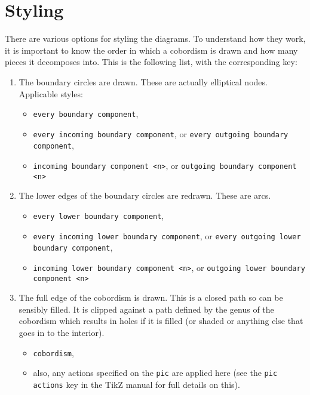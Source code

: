 \documentclass{ltxdoc}
\begin{document}
\section{Styling}

There are various options for styling the diagrams.
To understand how they work, it is important to know the order in which a cobordism is drawn and how many pieces it decomposes into.
This is the following list, with the corresponding key:

\begin{enumerate}
\item The boundary circles are drawn.
These are actually elliptical nodes.
Applicable styles:

\begin{itemize}
\item \Verb+every boundary component+,
\item \Verb+every incoming boundary component+, or  \Verb+every outgoing boundary component+,
\item \Verb+incoming boundary component <n>+, or \Verb+outgoing boundary component <n>+
\end{itemize}

\item The lower edges of the boundary circles are redrawn.
These are arcs.

\begin{itemize}
\item \Verb+every lower boundary component+,
\item \Verb+every incoming lower boundary component+, or  \Verb+every outgoing lower boundary component+,
\item \Verb+incoming lower boundary component <n>+, or \Verb+outgoing lower boundary component <n>+
\end{itemize}

\item The full edge of the cobordism is drawn.
This is a closed path so can be sensibly filled.
It is clipped against a path defined by the genus of the cobordism which results in holes if it is filled (or shaded or anything else that goes in to the interior).

\begin{itemize}
\item \Verb+cobordism+,
\item also, any actions specified on the \Verb+pic+ are applied here (see the \Verb+pic actions+ key in the TikZ manual for full details on this).
\end{itemize}


\end{enumerate}
\end{document}
